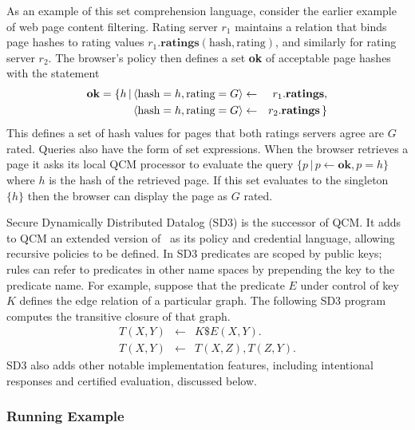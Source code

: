 As an example of this set comprehension language, consider the earlier
example of web page content filtering. Rating server $r_1$ maintains a
relation that binds page hashes to rating values
$r_1.\textbf{ratings}(\text{hash}, \text{rating})$, and similarly for rating
server $r_2$. The browser's policy then defines a set \textbf{ok} of
acceptable page hashes with the statement
\begin{eqnarray*}
\text{\bf ok} = \{h\,|\,
  \langle \text{hash} = h, \text{rating} = G \rangle & \leftarrow & 
    r_1.\textbf{ratings}, \\
  \langle \text{hash} = h, \text{rating} = G \rangle & \leftarrow &
    r_2.\textbf{ratings}\,\}
\end{eqnarray*}
This defines a set of hash values for pages that both ratings servers agree
are $G$ rated. Queries also have the form of set expressions. When the
browser retrieves a page it asks its local QCM processor to evaluate the
query $\{p\,|\,p \leftarrow \textbf{ok}, p = h\}$ where $h$ is the hash of
the retrieved page. If this set evaluates to the singleton $\{h\}$ then the
browser can display the page as $G$ rated.

Secure Dynamically Distributed Datalog (SD3) is the successor of
QCM. It adds to QCM an extended version of \datalog\ as its policy and
credential language, allowing recursive policies to be defined. In SD3
predicates are scoped by public keys; rules can refer to predicates in
other name spaces by prepending the key to the predicate name. For
example, suppose that the predicate $E$ under control of key $K$
defines the edge relation of a particular graph. The following SD3
program computes the transitive closure of that graph.
\begin{eqnarray*}
T(X, Y) &\leftarrow& K\$E(X, Y). \\
T(X, Y) &\leftarrow& T(X, Z), T(Z, Y).
\end{eqnarray*}
SD3 also adds other notable implementation features, including
intentional responses and certified evaluation, discussed below.

\subsubsection{Running Example}

